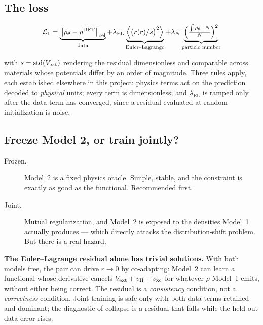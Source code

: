 \subsection{The loss}

\begin{equation}
  \mathcal{L}_1 =
    \underbrace{\bigl\lVert \rho_\theta - \rho^{\mathrm{DFT}} \bigr\rVert_{\mathrm{rel}}}_{\text{data}}
    + \lambda_{\mathrm{EL}}
      \underbrace{\Bigl\langle \bigl(r(\mathbf{r})/s\bigr)^2 \Bigr\rangle}_{\text{Euler--Lagrange}}
    + \lambda_{N}
      \underbrace{\Bigl(\tfrac{\int\rho_\theta - N}{N}\Bigr)^2}_{\text{particle number}}
\end{equation}

with $s=\operatorname{std}(V_{\mathrm{ext}})$ rendering the residual dimensionless and
comparable across materials whose potentials differ by an order of magnitude.
Three rules apply, each established elsewhere in this project: physics terms act
on the prediction decoded to \emph{physical} units; every term is
dimensionless; and $\lambda_{\mathrm{EL}}$ is ramped only after the data term
has converged, since a residual evaluated at random initialization is noise.

\subsection{Freeze Model 2, or train jointly?}

\begin{description}
  \item[Frozen.] Model~2 is a fixed physics oracle. Simple, stable, and the
    constraint is exactly as good as the functional. Recommended first.
  \item[Joint.] Mutual regularization, and Model~2 is exposed to the densities
    Model~1 actually produces --- which directly attacks the distribution-shift
    problem. But there is a real hazard.
\end{description}

\begin{pwarn}
\textbf{The Euler--Lagrange residual alone has trivial solutions.} With both
models free, the pair can drive $r\to0$ by co-adapting: Model~2 can learn a
functional whose derivative cancels $V_{\mathrm{ext}}+v_{\mathrm{H}}+v_{\mathrm{xc}}$ for whatever $\rho$
Model~1 emits, without either being correct. The residual is a
\emph{consistency} condition, not a \emph{correctness} condition. Joint training
is safe only with both data terms retained and dominant; the diagnostic of
collapse is a residual that falls while the held-out data error rises.
\end{pwarn}

